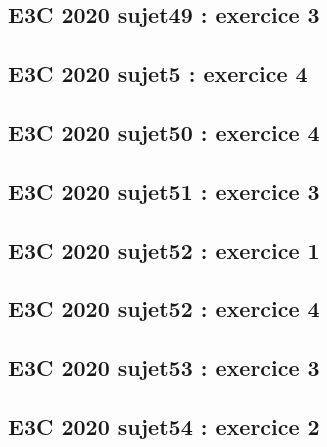 \documentclass[lang=fr,edition=teacher,layout=sheet]{mxbook}
\begin{document}
\par\bigskip
{}\subsection*{E3C 2020 sujet49 : exercice 3}
\begingroup\endgroup
\par\bigskip
{}\subsection*{E3C 2020 sujet5 : exercice 4}
\begingroup\endgroup
\par\bigskip
{}\subsection*{E3C 2020 sujet50 : exercice 4}
\begingroup\endgroup
\par\bigskip
{}\subsection*{E3C 2020 sujet51 : exercice 3}
\begingroup\endgroup
\par\bigskip
{}\subsection*{E3C 2020 sujet52 : exercice 1}
\begingroup\endgroup
\par\bigskip
{}\subsection*{E3C 2020 sujet52 : exercice 4}
\begingroup\endgroup
\par\bigskip
{}\subsection*{E3C 2020 sujet53 : exercice 3}
\begingroup\endgroup
\par\bigskip
{}\subsection*{E3C 2020 sujet54 : exercice 2}
\end{document}
